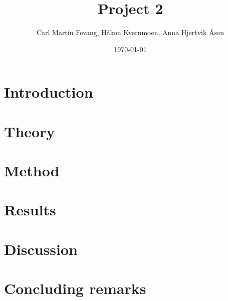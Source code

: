 \documentclass[twocolumn,english,notitlepage]{article}
\title{Project 2}
\author{Carl Martin Fevang, Håkon Kvernmoen, Anna Hjertvik Åsen}
\date{\today}
\begin{document}


\section{Introduction}


\section{Theory}


\section{Method}


\section{Results}


\section{Discussion}


\section{Concluding remarks}


\renewcommand{\theequation}{\thesection.\arabic{equation}}
\begin{appendices}
    
\end{appendices}

\printbibliography
\end{document}
